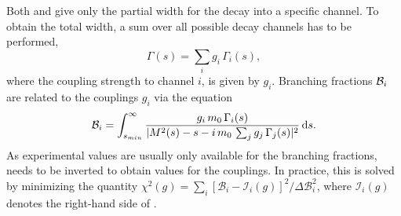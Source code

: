 Both  and  give only the partial width for the decay into a specific channel.
To obtain the total width, a sum over all possible decay channels has to be performed,
\begin{equation}
	\Gamma(s) = \sum_{i} g_{i} \, \Gamma_{i}(s) ,
\end{equation}
where the coupling strength to channel $i$, is given by $g_{i}$.
Branching fractions ${\cal B}_{i}$ are related to the couplings $g_{i}$ via the equation \cite{PDG2016}
\begin{equation}
	{\cal B}_{i} = \int_{s_{min}}^{\infty} \frac{g_{i} \, m_{0} \, \Gamma_{i}(s)}{ \vert M^{2}(s) - s - i \, m_{0} \, \sum_{j} g_{j} \, \Gamma_{j}(s) \vert^{2}} \, \text{d}s  .
	\label{eq:BF}
\end{equation}
As experimental values are usually only available for the branching fractions,  needs to be inverted to obtain values for the couplings.
In practice, this is solved by minimizing the quantity $\chi^{2}(g) = \sum_{i}  \left[ \mathcal B_{i} - \mathcal I_{i}(g) \right]^{2} / \Delta\mathcal B_{i}^{2}$, 
where $\mathcal I_{i}(g)$ denotes the right-hand side of .


